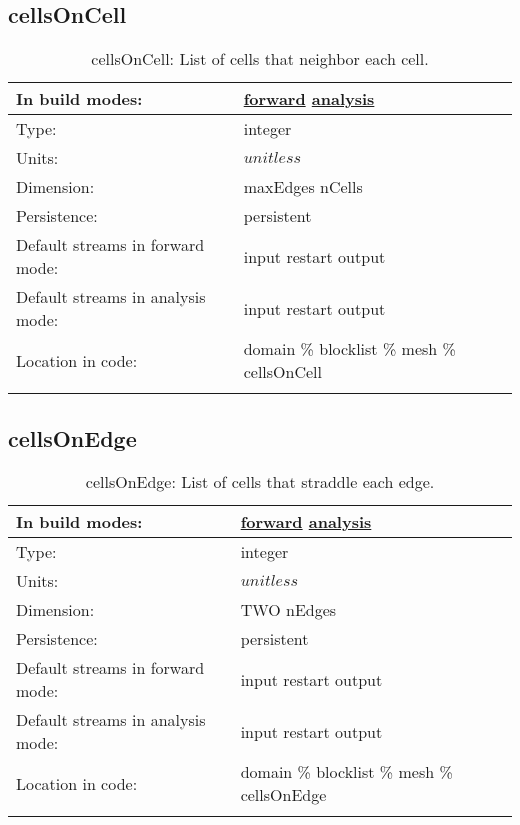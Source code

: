 \subsection[cellsOnCell]{cellsOnCell}
\label{subsec:var_sec_mesh_cellsOnCell}
\begin{center}
\begin{longtable}{| p{2.0in} | p{4.0in} |}
        \hline 
        In build modes: & \hyperref[subsec:forward_var_tab_mesh]{forward} \hyperref[subsec:analysis_var_tab_mesh]{analysis} \\
        \hline 
        Type: & integer \\
        \hline 
        Units: & $unitless$ \\
        \hline 
        Dimension: & maxEdges nCells \\
        \hline 
        Persistence: & persistent \\
        \hline 
		 Default streams in forward mode: &  input restart output \\
        \hline 
		 Default streams in analysis mode: &  input restart output \\
        \hline 
		 Location in code: & domain \% blocklist \% mesh \% cellsOnCell \\
		 \hline 
    \caption{cellsOnCell: List of cells that neighbor each cell.}
\end{longtable}
\end{center}
\subsection[cellsOnEdge]{cellsOnEdge}
\label{subsec:var_sec_mesh_cellsOnEdge}
\begin{center}
\begin{longtable}{| p{2.0in} | p{4.0in} |}
        \hline 
        In build modes: & \hyperref[subsec:forward_var_tab_mesh]{forward} \hyperref[subsec:analysis_var_tab_mesh]{analysis} \\
        \hline 
        Type: & integer \\
        \hline 
        Units: & $unitless$ \\
        \hline 
        Dimension: & TWO nEdges \\
        \hline 
        Persistence: & persistent \\
        \hline 
		 Default streams in forward mode: &  input restart output \\
        \hline 
		 Default streams in analysis mode: &  input restart output \\
        \hline 
		 Location in code: & domain \% blocklist \% mesh \% cellsOnEdge \\
		 \hline 
    \caption{cellsOnEdge: List of cells that straddle each edge.}
\end{longtable}
\end{center}
